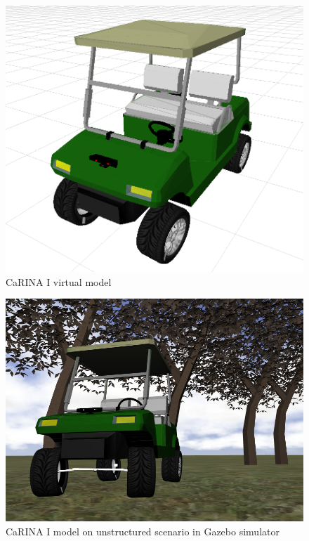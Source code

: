 \begin{figure}[ht]
	\begin{minipage}[b]{1\linewidth}
	    \centering
	    \includegraphics[width=\textwidth]{modelo_carina/carina_rviz_fundo_branco.png}
	 	\caption{CaRINA I virtual model}
	 	\label{fig:model}
	\end{minipage}
\end{figure}

\begin{figure}[ht]
	\begin{minipage}[b]{1\linewidth}
	    \centering
	    \includegraphics[width=\textwidth]{modelo_carina/carina_gazebo_frente_fundo.png}
	 	\caption{CaRINA I model on unstructured scenario in Gazebo simulator}
	 	\label{fig:gazebo}
	\end{minipage}
\end{figure}

